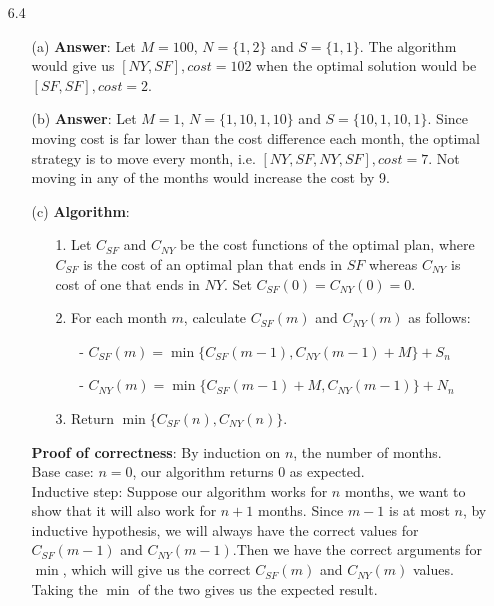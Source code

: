 \documentclass{article}
\begin{document}
\begin{itemize}
    \item [6.4]
          \begin{itemize}
              \item [(a)]
                    \textbf{Answer}: Let $M=100$, $N=\{1,2\}$ and $S=\{1,1\}$. The algorithm would give us $[NY,SF], cost=102$ when the optimal solution would be $[SF,SF], cost=2$.
              \item [(b)]
                    \textbf{Answer}: Let $M=1$, $N=\{1,10,1,10\}$ and $S=\{10,1,10,1\}$. Since moving cost is far lower than the cost difference each month, the optimal strategy is to move every month, i.e. $[NY,SF,NY,SF],cost=7$. Not moving in any of the months would increase the cost by 9.
              \item [(c)]
                    \textbf{Algorithm}:
                    \begin{itemize}
                        \item [1.] Let $C_{SF}$ and $C_{NY}$ be the cost functions of the optimal plan, where $C_{SF}$ is the cost of an optimal plan that ends in $SF$ whereas $C_{NY}$ is cost of one that ends in $NY$. Set $C_{SF}(0)=C_{NY}(0)=0$.
                        \item [2.] For each month $m$, calculate $C_{SF}(m)$ and $C_{NY}(m)$ as follows:
                              \begin{itemize}
                                  \item [-] $C_{SF}(m)=\min\{C_{SF}(m-1),C_{NY}(m-1)+M\}+S_{n}$
                                  \item [-] $C_{NY}(m)=\min\{C_{SF}(m-1)+M,C_{NY}(m-1)\}+N_{n}$
                              \end{itemize}
                        \item [3.] Return $\min\{C_{SF}(n),C_{NY}(n)\}$.
                    \end{itemize}
                    \textbf{Proof of correctness}: By induction on $n$, the number of months.\\
                    Base case: $n=0$, our algorithm returns $0$ as expected.\\
                    Inductive step: Suppose our algorithm works for $n$ months, we want to show that it will also work for $n+1$ months. Since $m-1$ is at most $n$, by inductive hypothesis, we will always have the correct values for $C_{SF}(m-1)$ and $C_{NY}(m-1)$.Then we have the correct arguments for $\min$, which will give us the correct $C_{SF}(m)$ and $C_{NY}(m)$ values. Taking the $\min$ of the two gives us the expected result.\\

\end{itemize}
\end{itemize}
\end{document}
